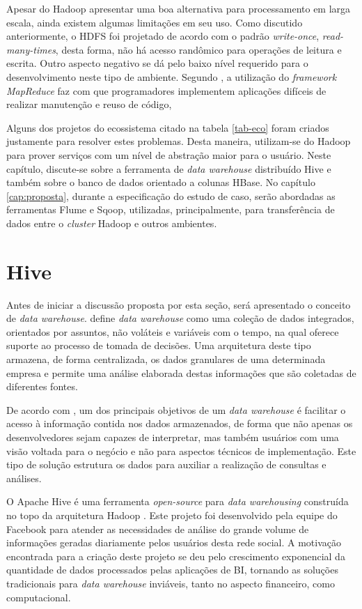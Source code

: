 Apesar do Hadoop apresentar uma boa alternativa para processamento em larga escala, ainda existem algumas limitações em seu uso. Como discutido anteriormente, o HDFS foi projetado de acordo com o padrão \textit{write-once}, \textit{read-many-times}, desta forma, não há acesso randômico para operações de leitura e escrita. Outro aspecto negativo se dá pelo baixo nível requerido para o desenvolvimento neste tipo de ambiente. Segundo , a utilização do \textit{framework} \textit{MapReduce} faz com que programadores implementem aplicações difíceis de realizar manutenção e reuso de código,

Alguns dos projetos do ecossistema citado na tabela \ref{tab-eco} foram criados justamente para resolver estes problemas. Desta maneira, utilizam-se do Hadoop para prover serviços com um nível de abstração maior para o usuário. Neste capítulo, discute-se sobre a ferramenta de \textit{data warehouse} distribuído Hive e também sobre o banco de dados orientado a colunas HBase. No capítulo \ref{cap:proposta}, durante a especificação do estudo de caso, serão abordadas as ferramentas Flume e Sqoop, utilizadas, principalmente, para transferência de dados entre o \textit{cluster} Hadoop e outros ambientes.

\section{Hive}

Antes de iniciar a discussão proposta por esta seção, será apresentado o conceito de \textit{data warehouse}.  define \textit{data warehouse} como uma coleção de dados integrados, orientados por assuntos, não voláteis e variáveis com o tempo, na qual oferece suporte ao processo de tomada de decisões. Uma arquitetura deste tipo armazena, de forma centralizada, os dados granulares de uma determinada empresa e permite uma análise elaborada destas informações que são coletadas de diferentes fontes.

De acordo com , um dos principais objetivos de um \textit{data warehouse} é facilitar o acesso à informação contida nos dados armazenados, de forma que não apenas os desenvolvedores sejam capazes de interpretar, mas também usuários com uma visão voltada para o negócio e não para aspectos técnicos de implementação. Este tipo de solução estrutura os dados para auxiliar a realização de consultas e análises.

O Apache Hive é uma ferramenta \textit{open-source} para \textit{data warehousing} construída no topo da arquitetura  Hadoop \cite{thusoo2009}. Este projeto foi desenvolvido pela equipe do Facebook para atender as necessidades de análise do grande volume de informações geradas diariamente pelos usuários desta rede social. A motivação encontrada para a criação deste projeto se deu pelo crescimento exponencial da quantidade de dados processados pelas aplicações de BI, tornando as soluções tradicionais para \textit{data warehouse} inviáveis, tanto no aspecto financeiro, como computacional.

